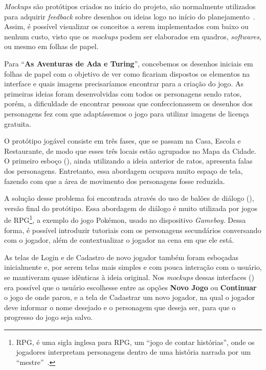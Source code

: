 \textit{Mockups} são protótipos criados no início do projeto, são normalmente utilizados para adquirir \textit{feedback} sobre desenhos ou ideias logo no início do planejamento~\cite{interaction_design_foundation_mock-ups_nodate}. Assim, é possível visualizar os conceitos a serem implementados com baixo ou nenhum custo, visto que os \textit{mockups} podem ser elaborados em quadros, \textit{softwares}, ou mesmo em folhas de papel.

Para “\textbf{As Aventuras de Ada e Turing}”, concebemos os desenhos iniciais em folhas de papel com o objetivo de ver como ficariam dispostos os elementos na interface e quais imagens precisaríamos encontrar para a criação do jogo. As primeiras ideias foram desenvolvidas com todos os personagens sendo ratos, porém, a dificuldade de encontrar pessoas que confeccionassem os desenhos dos personagens fez com que adaptássemos o jogo para utilizar imagens de licença gratuita.

O protótipo jogável consiste em três fases, que se passam na Casa, Escola e Restaurante, de modo que esses três locais estão agrupados no Mapa da Cidade. O primeiro esboço (), ainda utilizando a ideia anterior de ratos, apresenta falas dos personagens. Entretanto, essa abordagem ocupava muito espaço de tela, fazendo com que a área de movimento dos personagens fosse reduzida. 


A solução desse problema foi encontrada através do uso de balões de diálogo (), versão final do protótipo. Essa abordagem de diálogo é muito utilizada por jogos de \acrshort{RPG}\footnote{\acrshort{RPG}, é uma sigla inglesa para \acrlong{RPG}, um “jogo de contar histórias”, onde os jogadores interpretam personagens dentro de uma história narrada por um “mestre”~\cite{cabalero_o_2007}.}, a exemplo do jogo Pokémon, usado no dispositivo \textit{Gameboy}. Dessa forma, é possível introduzir tutoriais com os personagens secundários conversando com o jogador, além de contextualizar o jogador na cena em que ele está.


As telas de Login e de Cadastro de novo jogador também foram esboçadas inicialmente e, por serem telas mais simples e com pouca interação com o usuário, se mantiveram quase idênticas à ideia original. Nos \textit{mockups} dessas interfaces () era possível que o usuário escolhesse entre as opções \textbf{Novo Jogo} ou \textbf{Continuar} o jogo de onde parou, e a tela de Cadastrar um novo jogador, na qual o jogador deve informar o nome desejado e o personagem que deseja ser, para que o progresso do jogo seja salvo.

